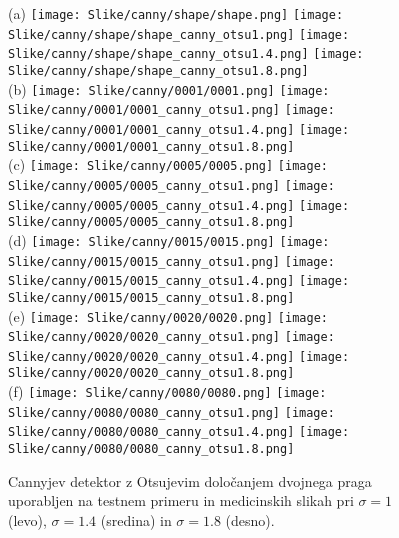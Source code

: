 \documentclass{article}
\begin{document}
    \begin{figure}[H]
        \centering
        (a)
        \texttt{[image: Slike/canny/shape/shape.png]} 
        \texttt{[image: Slike/canny/shape/shape\_canny\_otsu1.png]}
        \texttt{[image: Slike/canny/shape/shape\_canny\_otsu1.4.png]} 
        \texttt{[image: Slike/canny/shape/shape\_canny\_otsu1.8.png]} \\
        (b)
        \texttt{[image: Slike/canny/0001/0001.png]} 
        \texttt{[image: Slike/canny/0001/0001\_canny\_otsu1.png]}
        \texttt{[image: Slike/canny/0001/0001\_canny\_otsu1.4.png]} 
        \texttt{[image: Slike/canny/0001/0001\_canny\_otsu1.8.png]} \\
        (c)
        \texttt{[image: Slike/canny/0005/0005.png]} 
        \texttt{[image: Slike/canny/0005/0005\_canny\_otsu1.png]}
        \texttt{[image: Slike/canny/0005/0005\_canny\_otsu1.4.png]} 
        \texttt{[image: Slike/canny/0005/0005\_canny\_otsu1.8.png]}\\
        (d)
        \texttt{[image: Slike/canny/0015/0015.png]} 
        \texttt{[image: Slike/canny/0015/0015\_canny\_otsu1.png]}
        \texttt{[image: Slike/canny/0015/0015\_canny\_otsu1.4.png]} 
        \texttt{[image: Slike/canny/0015/0015\_canny\_otsu1.8.png]}\\
        (e)
        \texttt{[image: Slike/canny/0020/0020.png]} 
        \texttt{[image: Slike/canny/0020/0020\_canny\_otsu1.png]}
        \texttt{[image: Slike/canny/0020/0020\_canny\_otsu1.4.png]} 
        \texttt{[image: Slike/canny/0020/0020\_canny\_otsu1.8.png]}\\
        (f)
        \texttt{[image: Slike/canny/0080/0080.png]} 
        \texttt{[image: Slike/canny/0080/0080\_canny\_otsu1.png]}
        \texttt{[image: Slike/canny/0080/0080\_canny\_otsu1.4.png]} 
        \texttt{[image: Slike/canny/0080/0080\_canny\_otsu1.8.png]}
        \caption{Cannyjev detektor z Otsujevim določanjem dvojnega praga uporabljen na testnem primeru in medicinskih slikah pri $\sigma = 1$ (levo), $\sigma = 1.4$ (sredina) in $\sigma = 1.8$ (desno).}
        \label{improved}
    \end{figure}
\end{document}

